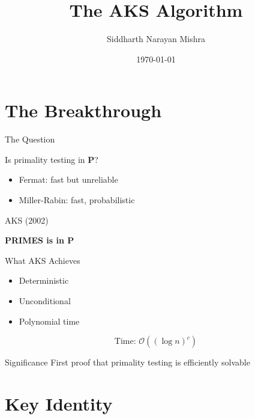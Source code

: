 \documentclass{beamer}
\title{The AKS Algorithm}
\author{Siddharth Narayan Mishra}
\date{\today}
\newcommand{\bigO}{\mathcal{O}}
\begin{document}
\maketitle

\section{The Breakthrough}

\begin{frame}{The Question}

\begin{center}
\Large
Is primality testing in $\mathbf{P}$?
\end{center}


\begin{itemize}
    \item Fermat: fast but unreliable
    \item Miller-Rabin: fast, probabilistic
\end{itemize}


\begin{block}{AKS (2002)}
\begin{center}
\textbf{PRIMES is in $\mathbf{P}$}
\end{center}
\end{block}

\end{frame}


\begin{frame}{What AKS Achieves}

\begin{itemize}
    \item Deterministic
    \item Unconditional
    \item Polynomial time
\end{itemize}


\[
\text{Time: } \bigO((\log n)^{c})
\]


\begin{block}{Significance}
First proof that primality testing is efficiently solvable
\end{block}

\end{frame}

\section{Key Identity}
\end{document}
